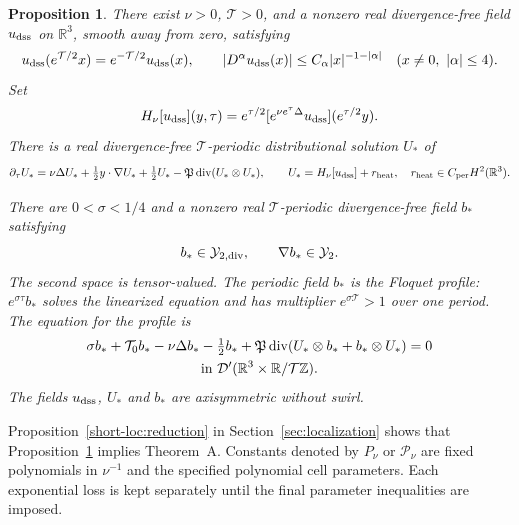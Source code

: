 \documentclass[11pt]{article}
\numberwithin{equation}{section}
\newtheorem{proposition}[theorem]{Proposition}
\theoremstyle{definition}
\theoremstyle{remark}
\theoremstyle{plain}
\newcommand{\R}{\mathbb R}
\begin{document}
\begin{proposition}\label{prop:unstable-background}
There exist \(\nu>0\), \(\mathcal T>0\), and a nonzero real divergence-free
field \(u_{\rm dss}\) on \(\mathbb R^3\), smooth away from zero, satisfying
\begin{equation}
 u_{\rm dss}(e^{\mathcal T/2}x)=e^{-\mathcal T/2}u_{\rm dss}(x),\qquad
 |D^\alpha u_{\rm dss}(x)|\le C_\alpha |x|^{-1-|\alpha|}
 \quad (x\ne0,\ |\alpha|\le4).
 \label{loc:eq:dss}
\end{equation}
Set
\[
 H_\nu[u_{\rm dss}](y,\tau)=e^{\tau/2}
       [e^{\nu e^\tau\Delta}u_{\rm dss}](e^{\tau/2}y).
\]
There is a real divergence-free \(\mathcal T\)-periodic distributional
solution \(U_*\) of
\begin{equation}
 \partial_\tau U_*=\nu\Delta U_*+\tfrac12 y\cdot\nabla U_*+\tfrac12 U_*-\mathfrak P\operatorname{div}(U_*\otimes U_*),
 \qquad U_*=H_\nu[u_{\rm dss}]+r_{\rm heat},\quad r_{\rm heat}\in C_{\rm per}H^2(\mathbb R^3).
 \label{loc:eq:background}
\end{equation}

There are \(0<\sigma<1/4\) and a nonzero real \(\mathcal T\)-periodic
divergence-free field \(b_*\) satisfying
\begin{equation}
 b_*\in\mathcal Y_{2,\rm div},\qquad \nabla b_*\in\mathcal Y_2.
 \label{loc:eq:energy-mode}
\end{equation}
The second space is tensor-valued. The periodic field \(b_*\) is the
Floquet profile: \(e^{\sigma\tau}b_*\) solves the linearized equation
and has multiplier \(e^{\sigma\mathcal T}>1\) over one period.
The equation for the profile is
\begin{equation}
 \begin{gathered}
 \sigma b_*+\mathcal T_0 b_*-\nu\Delta b_*-\tfrac12 b_*
 +\mathfrak P\operatorname{div}(U_*\otimes b_*+b_*\otimes U_*)=0\\
 \hbox{in }\mathcal D'(\R^3\times\R/\mathcal T\mathbb Z).
 \end{gathered}
 \label{loc:eq:mode}
\end{equation}
The fields \(u_{\rm dss}\), \(U_*\) and \(b_*\) are axisymmetric
without swirl.

\end{proposition}

Proposition~\ref{short-loc:reduction} in Section~\ref{sec:localization}
shows that Proposition~\ref{prop:unstable-background} implies Theorem~A.
Constants denoted by $P_\nu$ or $\mathcal P_\nu$ are fixed polynomials
in $\nu^{-1}$ and the specified polynomial cell parameters. Each
exponential loss is kept separately until the final parameter
inequalities are imposed.
\end{document}
